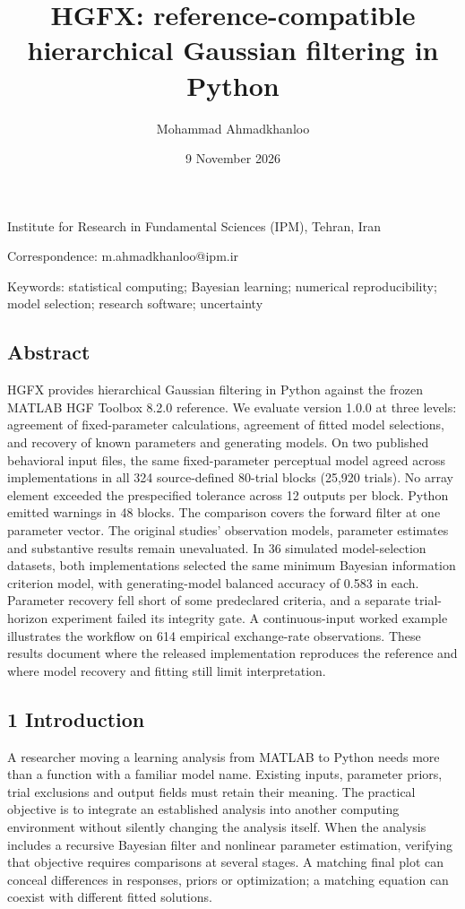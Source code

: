 \documentclass[
  11pt,
]{article}
\title{HGFX: reference-compatible hierarchical Gaussian filtering in
Python}
\author{Mohammad Ahmadkhanloo}
\date{9 November 2026}
\begin{document}
\maketitle

Institute for Research in Fundamental Sciences (IPM), Tehran, Iran

Correspondence: m.ahmadkhanloo@ipm.ir

Keywords: statistical computing; Bayesian learning; numerical
reproducibility; model selection; research software; uncertainty

\subsection{Abstract}\label{abstract}

HGFX provides hierarchical Gaussian filtering in Python against the
frozen MATLAB HGF Toolbox 8.2.0 reference. We evaluate version 1.0.0 at
three levels: agreement of fixed-parameter calculations, agreement of
fitted model selections, and recovery of known parameters and generating
models. On two published behavioral input files, the same
fixed-parameter perceptual model agreed across implementations in all
324 source-defined 80-trial blocks (25,920 trials). No array element
exceeded the prespecified tolerance across 12 outputs per block. Python
emitted warnings in 48 blocks. The comparison covers the forward filter
at one parameter vector. The original studies' observation models,
parameter estimates and substantive results remain unevaluated. In 36
simulated model-selection datasets, both implementations selected the
same minimum Bayesian information criterion model, with generating-model
balanced accuracy of 0.583 in each. Parameter recovery fell short of
some predeclared criteria, and a separate trial-horizon experiment
failed its integrity gate. A continuous-input worked example illustrates
the workflow on 614 empirical exchange-rate observations. These results
document where the released implementation reproduces the reference and
where model recovery and fitting still limit interpretation.

\subsection{1 Introduction}\label{introduction}

A researcher moving a learning analysis from MATLAB to Python needs more
than a function with a familiar model name. Existing inputs, parameter
priors, trial exclusions and output fields must retain their meaning.
The practical objective is to integrate an established analysis into
another computing environment without silently changing the analysis
itself. When the analysis includes a recursive Bayesian filter and
nonlinear parameter estimation, verifying that objective requires
comparisons at several stages. A matching final plot can conceal
differences in responses, priors or optimization; a matching equation
can coexist with different fitted solutions.
\end{document}
